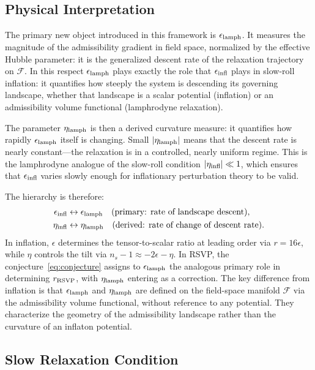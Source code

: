 \documentclass[12pt, a4paper]{article}
\newcommand{\calF}{\mathcal{F}}
\newcommand{\etalamph}{\eta_{\rm lamph}}
\newcommand{\epslamph}{\epsilon_{\rm lamph}}
\newcommand{\rRSVP}{r_{\rm RSVP}}
\begin{document}
\subsection{Physical Interpretation}

The primary new object introduced in this framework is $\epslamph$. It measures the
magnitude of the admissibility gradient in field space, normalized by the effective
Hubble parameter: it is the generalized descent rate of the relaxation trajectory on
$\calF$. In this respect $\epslamph$ plays exactly the role that $\epsilon_{\rm infl}$
plays in slow-roll inflation: it quantifies how steeply the system is descending its
governing landscape, whether that landscape is a scalar potential (inflation) or an
admissibility volume functional (lamphrodyne relaxation).

The parameter $\etalamph$ is then a derived curvature measure: it quantifies how
rapidly $\epslamph$ itself is changing. Small $|\etalamph|$ means that the descent
rate is nearly constant---the relaxation is in a controlled, nearly uniform regime.
This is the lamphrodyne analogue of the slow-roll condition $|\eta_{\rm infl}| \ll 1$,
which ensures that $\epsilon_{\rm infl}$ varies slowly enough for inflationary
perturbation theory to be valid.

The hierarchy is therefore:
\begin{align}
\epsilon_{\rm infl} &\leftrightarrow \epslamph \quad
  (\text{primary: rate of landscape descent}), \\
\eta_{\rm infl} &\leftrightarrow \etalamph \quad
  (\text{derived: rate of change of descent rate}).
\end{align}
In inflation, $\epsilon$ determines the tensor-to-scalar ratio at leading order via
$r = 16\epsilon$, while $\eta$ controls the tilt via $n_s - 1 \approx -2\epsilon -
\eta$. In RSVP, the conjecture~\eqref{eq:conjecture} assigns to $\epslamph$ the
analogous primary role in determining $\rRSVP$, with $\etalamph$ entering as a
correction. The key difference from inflation is that $\epslamph$ and $\etalamph$
are defined on the field-space manifold $\calF$ via the admissibility volume
functional, without reference to any potential. They characterize the geometry of
the admissibility landscape rather than the curvature of an inflaton potential.

\subsection{Slow Relaxation Condition}
\end{document}
